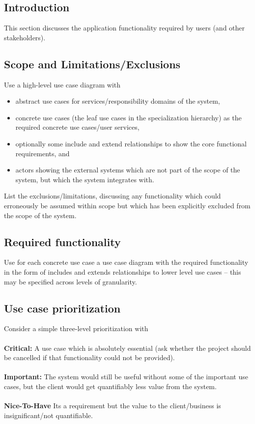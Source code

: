 \documentclass[11pt,a4paper]{article}
\begin{document}
\subsection{Introduction}
This section discusses the application functionality required by users (and other stakeholders).
\subsection{Scope and Limitations/Exclusions}
Use a high-level use case diagram with
\begin{itemize}
	\item abstract use cases for services/responsibility domains of the system,
	\item concrete use cases (the leaf use cases in the specialization hierarchy) as the required concrete use cases/user services,
	\item optionally some include and extend relationships to show the core functional requirements, and
	\item actors showing the external systems which are not part of the scope of the system, but which
the system integrates with.
\end{itemize}
List the exclusions/limitations, discussing any functionality which could erroneously be assumed within scope but which has been explicitly excluded from the scope of the system.
\subsection{Required functionality}
Use for each concrete use case a use case diagram with the required functionality in the form of includes and extends relationships to lower level use cases – this may be specified across levels of granularity.
\subsection{Use case prioritization}
Consider a simple three-level prioritization with
\\\\
\textbf{Critical: }A use case which is absolutely essential (ask whether the project should be cancelled if that functionality could not be provided).
\\\\
\textbf{Important: } The system would still be useful without some of the important use cases, but the client would get quantifiably less value from the system.
\\\\
\textbf{Nice-To-Have} Its a requirement but the value to the client/business is insignificant/not quantifiable.
\end{document}
